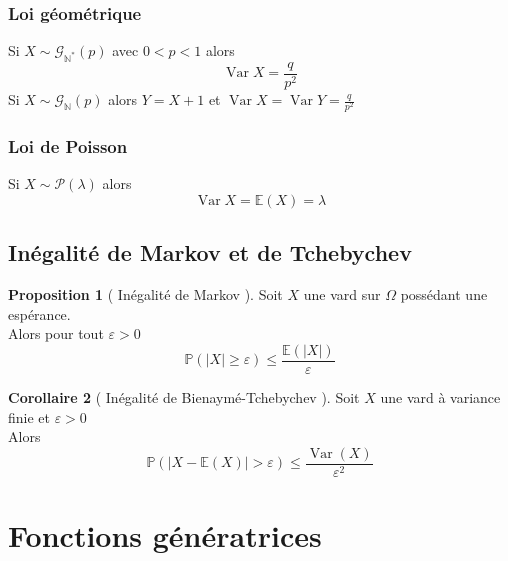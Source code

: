 \documentclass[10pt,a4paper]{article}
\theoremstyle{definition}
\newtheorem{proposition}{Proposition}[section]
\newtheorem{corollary}[proposition]{Corollaire}
\DeclareMathOperator{\var}{Var}
\begin{document}
\subsubsection{Loi géométrique}
\noindent Si \(X \sim \mathcal{G}_{\mathbb{N}^*}(p)\) avec \(0 < p < 1\) alors
\[\boxed{\var X = \frac{q}{p^2}}\]
Si \(X \sim \mathcal{G}_{\mathbb{N}}(p)\) alors \(Y = X + 1\) et \(\var X = \var Y = \frac{q}{p^2}\)

\subsubsection{Loi de Poisson}
\noindent Si \(X \sim \mathcal{P}(\lambda)\) alors
\[\boxed{\var X = \mathbb{E}(X) = \lambda}\]

\subsection{Inégalité de Markov et de Tchebychev}
\begin{proposition}[ Inégalité de Markov ]
    Soit \(X\) une vard sur \(\Omega\) possédant une espérance. \\
    Alors pour tout \(\varepsilon > 0\)
    \[\boxed{\mathbb{P}(|X| \geq \varepsilon) \leq \frac{\mathbb{E}(|X|)}{\varepsilon}}\]
\end{proposition}
\begin{corollary}[ Inégalité de Bienaymé-Tchebychev ]
    Soit \(X\) une vard à variance finie et \(\varepsilon > 0\) \\
    Alors \[\boxed{\mathbb{P}\left(|X - \mathbb{E}(X)| > \varepsilon\right) \leq \frac{\var(X)}{\varepsilon^2}}\]
\end{corollary}

\section{Fonctions génératrices}
\end{document}
